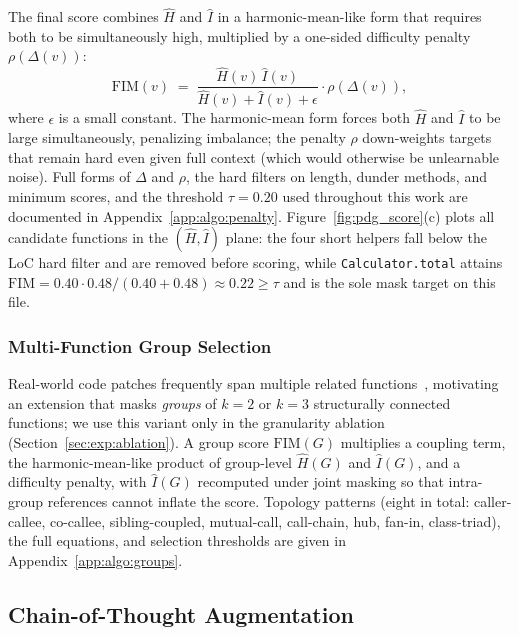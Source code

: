 The final score combines $\hat{H}$ and $\hat{I}$ in a harmonic-mean-like
form that requires both to be simultaneously high, multiplied by a
one-sided difficulty penalty $\rho(\Delta(v))$:
%
\begin{equation}
  \mathrm{FIM}(v) \;=\;
  \frac{\hat{H}(v)\,\hat{I}(v)}{\hat{H}(v) + \hat{I}(v) + \epsilon}
  \cdot \rho\!\left(\Delta(v)\right),
  \label{eq:fim_single}
\end{equation}
%
where $\epsilon$ is a small constant. The harmonic-mean form forces both
$\hat{H}$ and $\hat{I}$ to be large simultaneously, penalizing imbalance;
the penalty $\rho$ down-weights targets that remain hard even given full
context (which would otherwise be unlearnable noise). Full forms of
$\Delta$ and $\rho$, the hard filters on length, dunder methods, and
minimum scores, and the threshold $\tau\!=\!0.20$ used throughout this
work are documented in Appendix~\ref{app:algo:penalty}.
Figure~\ref{fig:pdg_score}(c) plots all candidate functions in the
$(\hat{H},\hat{I})$ plane: the four short helpers fall below the
LoC hard filter and are removed before scoring, while
\texttt{Calculator.total} attains
$\mathrm{FIM}\!=\!0.40\!\cdot\!0.48/(0.40\!+\!0.48)\!\approx\!0.22\!\geq\!\tau$
and is the sole mask target on this file.

\subsubsection{Multi-Function Group Selection}
\label{sec:method:groups}

Real-world code patches frequently span multiple related
functions~\citep{swebench}, motivating an extension that masks
\emph{groups} of $k=2$ or $k=3$ structurally connected functions; we use
this variant only in the granularity ablation
(Section~\ref{sec:exp:ablation}). A group score $\mathrm{FIM}(G)$
multiplies a coupling term, the harmonic-mean-like product of
group-level $\hat{H}(G)$ and $\hat{I}(G)$, and a difficulty penalty,
with $\hat{I}(G)$ recomputed under joint masking so that intra-group
references cannot inflate the score. Topology patterns (eight in total:
caller-callee, co-callee, sibling-coupled, mutual-call, call-chain, hub,
fan-in, class-triad), the full equations, and selection thresholds are
given in Appendix~\ref{app:algo:groups}.

\subsection{Chain-of-Thought Augmentation}
\label{sec:method:cot}

